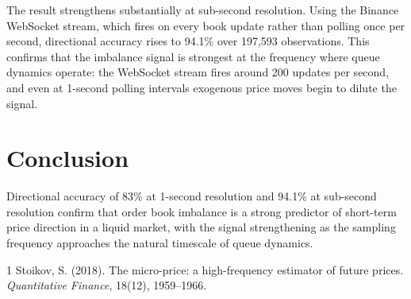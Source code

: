 \documentclass[11pt, a4paper]{article}
\begin{document}
\vspace{3mm}

The result strengthens substantially at sub-second resolution. Using the Binance WebSocket stream, which fires on every book update rather than polling once per second, directional accuracy rises to 94.1\% over 197,593 observations. This confirms that the imbalance signal is strongest at the frequency where queue dynamics operate: the WebSocket stream fires around 200 updates per second, and even at 1-second polling intervals exogenous price moves begin to dilute the signal.

\section{Conclusion}

Directional accuracy of 83\% at 1-second resolution and 94.1\% at sub-second resolution confirm that order book imbalance is a strong predictor of short-term price direction in a liquid market, with the signal strengthening as the sampling frequency approaches the natural timescale of queue dynamics.


\begin{thebibliography}{1}
Stoikov, S. (2018).
\newblock The micro-price: a high-frequency estimator of future prices.
\newblock \emph{Quantitative Finance}, 18(12), 1959--1966.
\end{thebibliography}
\end{document}
